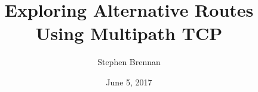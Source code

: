 \documentclass{beamer}
\title{Exploring Alternative Routes Using Multipath TCP}
\author{Stephen Brennan}
\date{June 5, 2017}
\begin{document}
\frame{\titlepage}
\end{document}
